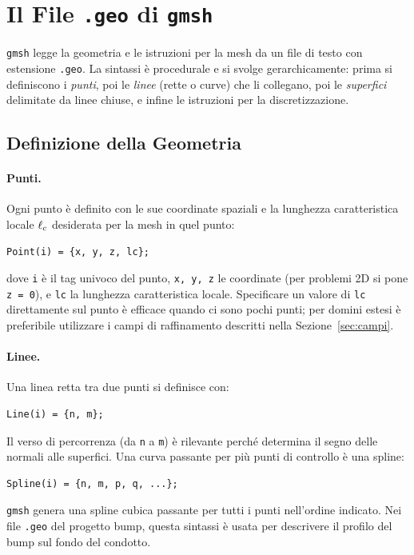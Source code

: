\section{Il File \texttt{.geo} di \texttt{gmsh}}
\label{sec:filegeo}

\texttt{gmsh} legge la geometria e le istruzioni per la mesh da un file di testo con estensione
\texttt{.geo}. La sintassi è procedurale e si svolge gerarchicamente: prima si definiscono i
\emph{punti}, poi le \emph{linee} (rette o curve) che li collegano, poi le \emph{superfici}
delimitate da linee chiuse, e infine le istruzioni per la discretizzazione.

\subsection{Definizione della Geometria}

\paragraph{Punti.}
Ogni punto è definito con le sue coordinate spaziali e la lunghezza caratteristica locale
$\ell_c$ desiderata per la mesh in quel punto:
\begin{lstlisting}[style=gmsh, caption={Sintassi del comando \texttt{Point}.}]
Point(i) = {x, y, z, lc};
\end{lstlisting}
dove \texttt{i} è il tag univoco del punto, \texttt{x, y, z} le coordinate (per problemi 2D
si pone \texttt{z~=~0}), e \texttt{lc} la lunghezza caratteristica locale. Specificare un
valore di \texttt{lc} direttamente sul punto è efficace quando ci sono pochi punti; per
domini estesi è preferibile utilizzare i campi di raffinamento descritti nella
Sezione~\ref{sec:campi}.

\paragraph{Linee.}
Una linea retta tra due punti si definisce con:
\begin{lstlisting}[style=gmsh]
Line(i) = {n, m};
\end{lstlisting}
Il verso di percorrenza (da \texttt{n} a \texttt{m}) è rilevante perché determina il segno
delle normali alle superfici. Una curva passante per più punti di controllo è una spline:
\begin{lstlisting}[style=gmsh]
Spline(i) = {n, m, p, q, ...};
\end{lstlisting}
\texttt{gmsh} genera una spline cubica passante per tutti i punti nell'ordine indicato.
Nei file \texttt{.geo} del progetto bump, questa sintassi è usata per descrivere il profilo
del bump sul fondo del condotto.

